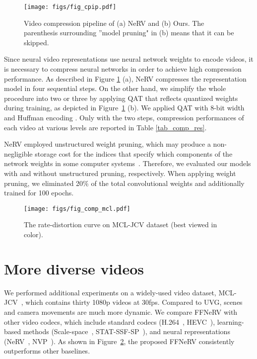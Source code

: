 \documentclass[sigconf]{acmart}
\begin{document}
\begin{figure}[ht]
\begin{center}
\texttt{[image: figs/fig\_cpip.pdf]}
\end{center}
   \caption{Video compression pipeline of (a) NeRV and (b) Ours. The parenthesis surrounding ''model pruning" in (b) means that it can be skipped.}
\label{fig_cpip}
\end{figure}

Since neural video representations use neural network weights to encode videos, it is necessary to compress neural networks in order to achieve high compression performance.
As described in Figure \ref{fig_cpip} (a), NeRV compresses the representation model in four sequential steps.
On the other hand, we simplify the whole procedure into two or three by applying QAT that reflects quantized weights during training, as depicted in Figure~\ref{fig_cpip} (b).
We applied QAT with 8-bit width and Huffman encoding  \cite{huffman}. Only with the two steps, compression performances of each video at various levels are reported in Table \ref{tab_comp_res}.

NeRV employed unstructured weight pruning, which may produce a non-negligible storage cost for the indices that specify which components of the network weights in some computer systems~\cite{weiprune}.
Therefore, we evaluated our models with and without unstructured pruning, respectively.
When applying weight pruning, we eliminated 20\% of the total convolutional weights and additionally trained for 100 epochs.



\begin{figure}[ht]
\begin{center}
\texttt{[image: figs/fig\_comp\_mcl.pdf]}
\end{center}
   \caption{The rate-distortion curve on MCL-JCV dataset (best viewed in color).}
\label{fig_comp_mcl}
\end{figure}

\section{More diverse videos}
We performed additional experiments on a widely-used video dataset, MCL-JCV~\cite{mcl}, which contains thirty 1080p videos at 30fps. 
Compared to UVG, scenes and camera movements are much more dynamic.
We compare FFNeRV with other video codecs, which include standard codecs (H.264~\cite{h264}, HEVC~\cite{hevc}), learning-based methods (Scale-space~\cite{scalespace}, STAT-SSF-SP~\cite{statssfsp}), and neural representations (NeRV~\cite{nerv}, NVP~\cite{scalable}).
As shown in Figure~\ref{fig_comp_mcl}, the proposed FFNeRV consistently outperforms other baselines.
\end{document}
